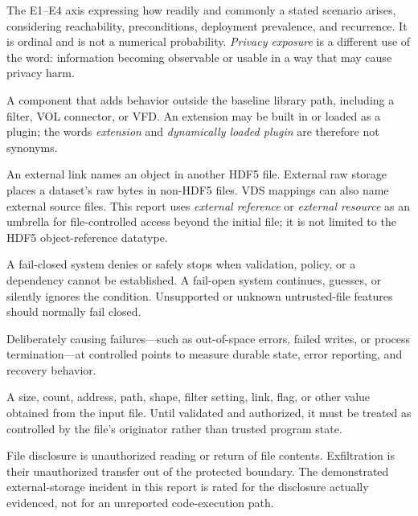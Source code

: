 \documentclass[../main.tex]{subfiles}
\begin{document}
\begin{description}[leftmargin=1.5em,style=nextline]
\item[Exposure (risk axis).]
The E1--E4 axis expressing how readily and commonly a stated scenario arises,
considering reachability, preconditions, deployment prevalence, and recurrence.
It is ordinal and is not a numerical probability. \emph{Privacy exposure} is a
different use of the word: information becoming observable or usable in a way
that may cause privacy harm.

\item[Extension.]
A component that adds behavior outside the baseline library path, including a
filter, VOL connector, or VFD. An extension may be built in or loaded as a
plugin; the words \emph{extension} and \emph{dynamically loaded plugin} are
therefore not synonyms.

\item[External link / external raw storage / external reference.]
An external link names an object in another HDF5 file. External raw storage
places a dataset's raw bytes in non-HDF5 files. VDS mappings can also name
external source files. This report uses \emph{external reference} or
\emph{external resource} as an umbrella for file-controlled access beyond the
initial file; it is not limited to the HDF5 object-reference datatype.

\item[Fail closed / fail open.]
A fail-closed system denies or safely stops when validation, policy, or a
dependency cannot be established. A fail-open system continues, guesses, or
silently ignores the condition. Unsupported or unknown untrusted-file features
should normally fail closed.

\item[Fault injection.]
Deliberately causing failures---such as out-of-space errors, failed writes, or
process termination---at controlled points to measure durable state, error
reporting, and recovery behavior.

\item[File-derived value / file-controlled metadata.]
A size, count, address, path, shape, filter setting, link, flag, or other value
obtained from the input file. Until validated and authorized, it must be treated
as controlled by the file's originator rather than trusted program state.

\item[File disclosure / data exfiltration.]
File disclosure is unauthorized reading or return of file contents.
Exfiltration is their unauthorized transfer out of the protected boundary.
The demonstrated external-storage incident in this report is rated for the
disclosure actually evidenced, not for an unreported code-execution path.


\end{description}
\end{document}
